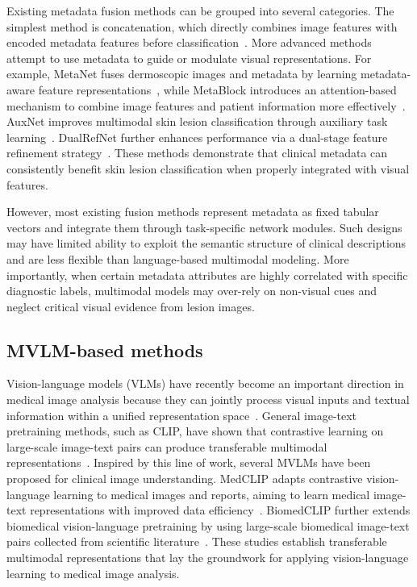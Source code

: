 \documentclass[preprint,12pt]{elsarticle}
\makeatletter
\def@NAT@last@yr{--\NAT@penalty}%
\makeatother
\begin{document}
Existing metadata fusion methods can be grouped into several categories. The simplest method is concatenation, which directly combines image features with encoded metadata features before classification~\cite{pacheco2020impact, kawahara2019seven, gessert2020skin, ou2022deep}. More advanced methods attempt to use metadata to guide or modulate visual representations. For example, MetaNet fuses dermoscopic images and metadata by learning metadata-aware feature representations~\cite{li2020fusing}, while MetaBlock introduces an attention-based mechanism to combine image features and patient information more effectively~\cite{pacheco2021attention}. AuxNet improves multimodal skin lesion classification through auxiliary task learning~\cite{khurshid2024optimizing}. DualRefNet further enhances performance via a dual-stage feature refinement strategy~\cite{khurshid2025multimodal}. These methods demonstrate that clinical metadata can consistently benefit skin lesion classification when properly integrated with visual features.

However, most existing fusion methods represent metadata as fixed tabular vectors and integrate them through task-specific network modules. Such designs may have limited ability to exploit the semantic structure of clinical descriptions and are less flexible than language-based multimodal modeling. More importantly, when certain metadata attributes are highly correlated with specific diagnostic labels, multimodal models may over-rely on non-visual cues and neglect critical visual evidence from lesion images. 


\subsection{MVLM-based methods}

Vision-language models (VLMs) have recently become an important direction in medical image analysis because they can jointly process visual inputs and textual information within a unified representation space~\cite{alayrac2022flamingo, liu2023visual, tu2024towards}. General image-text pretraining methods, such as CLIP, have shown that contrastive learning on large-scale image-text pairs can produce transferable multimodal representations~\cite{radford2021learning}. Inspired by this line of work, several MVLMs have been proposed for clinical image understanding. MedCLIP adapts contrastive vision-language learning to medical images and reports, aiming to learn medical image-text representations with improved data efficiency~\cite{wang2022medclip}. BiomedCLIP further extends biomedical vision-language pretraining by using large-scale biomedical image-text pairs collected from scientific literature~\cite{zhang2023biomedclip}. These studies establish transferable multimodal representations that lay the groundwork for applying vision-language learning to medical image analysis.
\end{document}
